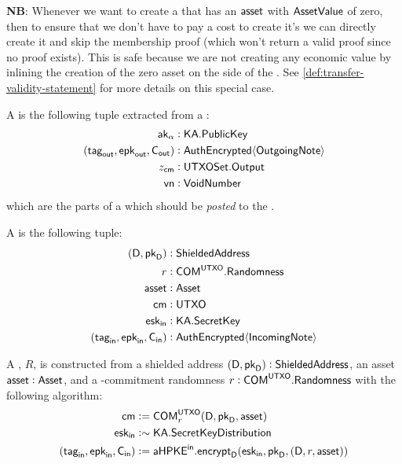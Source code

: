 \begin{definition}
    \textbf{NB}: Whenever we want to create a \Sender{} that has an ${\textsf{asset}}$ with ${\textsf{AssetValue}}$ of zero, then to ensure that we don't have to pay a cost to create it's \UTXO{} we can directly create it and skip the \UTXOSet{} membership proof (which won't return a valid proof since no proof exists). This is safe because we are not creating any economic value by inlining the creation of the zero asset on the \Sender{} side of the \Transfer{}. See \ref{def:transfer-validity-statement} for more details on this special case.
\end{definition}

\begin{definition}
    A \SenderPost{} is the following tuple extracted from a \Sender{}:
    \begin{align*}
        {\textsf{ak}}_\alpha                &: {\textsf{KA}}.{\textsf{PublicKey}} \\
        ({{\textsf{tag}}_{\textsf{out}}}, {{\textsf{epk}}_{\textsf{out}}}, {\textsf{C}_\textsf{out}}) &: {\textsf{AuthEncrypted}}\langle{{\textsf{OutgoingNote}}}\rangle \\
        z_{\textsf{cm}}                     &: {\textsf{UTXOSet}}.{\textsf{Output}} \\
        {\textsf{vn}}                       &: {\textsf{VoidNumber}}
    \end{align*}
    which are the parts of a \Sender{} which should be \emph{posted} to the \Ledger{}.
\end{definition}

\begin{definition}
    A \Receiver{} is the following tuple:
    \begin{align*}
        (\textsf{D}, {{\textsf{pk}}_\textsf{D}})     &: {\textsf{ShieldedAddress}} \\
        r                      &: {\textsf{COM}}^{\textsf{UTXO}}.{\textsf{Randomness}} \\
        {\textsf{asset}}                 &: {\textsf{Asset}} \\
        {\textsf{cm}}                    &: {\textsf{UTXO}} \\
        {{\textsf{esk}}_\textsf{in}}                 &: {\textsf{KA}}.{\textsf{SecretKey}} \\
        ({{\textsf{tag}}_\textsf{in}}, {{\textsf{epk}}_\textsf{in}}, {\textsf{C}_\textsf{in}}) &: {\textsf{AuthEncrypted}}\langle{{\textsf{IncomingNote}}}\rangle
    \end{align*}
    
    A \Receiver{}, $R$, is constructed from a shielded address $(\textsf{D}, {{\textsf{pk}}_\textsf{D}}) : {\textsf{ShieldedAddress}}$, an asset ${\textsf{asset}} : {\textsf{Asset}}$, and a \UTXO{}-commitment randomness $r : {\textsf{COM}}^{\textsf{UTXO}}.{\textsf{Randomness}}$ with the following algorithm:
    \begin{align*}
        {\textsf{cm}}                    &:= {\textsf{COM}}^{{\textsf{UTXO}}}_r(\textsf{D}, {{\textsf{pk}}_\textsf{D}}, {\textsf{asset}}) \\
        {{\textsf{esk}}_\textsf{in}}                 &:\sim {\textsf{KA}}.{\textsf{SecretKeyDistribution}} \\
        ({{\textsf{tag}}_\textsf{in}}, {{\textsf{epk}}_\textsf{in}}, {\textsf{C}_\textsf{in}}) &:= {{\textsf{aHPKE}}^\textsf{in}}.{\textsf{encrypt}}_\textsf{D}({{\textsf{esk}}_\textsf{in}}, {{\textsf{pk}}_\textsf{D}}, (\textsf{D}, r, {\textsf{asset}}))
    \end{align*}
\end{definition}

